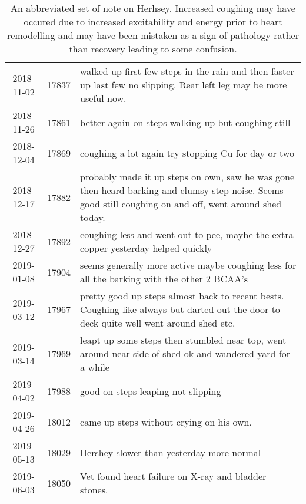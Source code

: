 {\begin{table}[H]
\begin{tabular}{|c|r|p{4in}|}
2018-11-02 & 17837 & walked up first few steps in the rain and then faster up last few no slipping. Rear left leg may be more useful now.  \\
2018-11-26 & 17861 & better again on steps walking up but coughing still  \\
2018-12-04 & 17869 &coughing a lot again try stopping Cu for day or two  \\
2018-12-17 & 17882 &probably made it up steps on own, saw he was gone then heard barking and clumsy step noise. Seems good still coughing on and off, went around shed today.  \\
2018-12-27 & 17892 &coughing less and went out to pee, maybe the extra copper yesterday helped quickly  \\
2019-01-08 & 17904 & seems generally more active maybe coughing less for all the barking with the other 2 BCAA's \\
2019-03-12 & 17967 & pretty good up steps almost back to recent bests. Coughing like always but darted out the door to deck quite well went around shed etc.  \\
2019-03-14 & 17969 &leapt up some steps then stumbled near top, went around near side of shed ok and wandered yard for a while  \\
2019-04-02 & 17988 &good on steps leaping not slipping  \\
2019-04-26 & 18012 &came up steps without crying on his own.  \\
2019-05-13 & 18029 & Hershey slower than yesterday more normal  \\
2019-06-03 & 18050 &Vet found heart failure on X-ray and bladder stones.   \\
\hline
\hline
\end{tabular}
\caption{ An abbreviated set of note on Herhsey. Increased coughing may have occured due to increased excitability and energy prior to heart remodelling and 
may have been mistaken as a sign of pathology rather than recovery leading
to some confusion. 
   }
\label{tab:hershey}
\end{table}
} %


